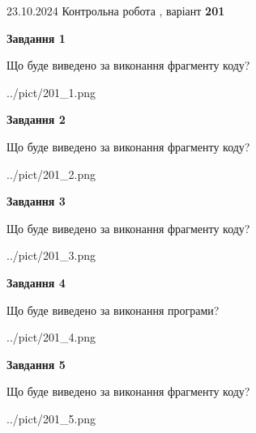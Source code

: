 \documentclass[12pt, ukrainian]{article}
\begin{document}
{\Large{23.10.2024 Контрольна робота , варіант  \No \textbf { 201 }\par}}
{
\begin {large}
{\begin {center}\textbf{Завдання 1}\end {center}}

Що буде виведено за виконання фрагменту коду?\par
\begin{center}
	{../pict/201_1.png}
\end{center}
\newpage

{\begin {center}\textbf{Завдання 2}\end {center}}

Що буде виведено за виконання фрагменту коду?\par
\begin{center}
	{../pict/201_2.png}
\end{center}
\newpage

{\begin {center}\textbf{Завдання 3}\end {center}}

Що буде виведено за виконання фрагменту коду?\par
\begin{center}
	{../pict/201_3.png}
\end{center}
\newpage

{\begin {center}\textbf{Завдання 4}\end {center}}

Що буде виведено за виконання програми?\par
\begin{center}
	{../pict/201_4.png}
\end{center}
\newpage

{\begin {center}\textbf{Завдання 5}\end {center}}

Що буде виведено за виконання фрагменту коду?\par
\begin{center}
	{../pict/201_5.png}
\end{center}
\newpage


\end{large}}
\end{document}
